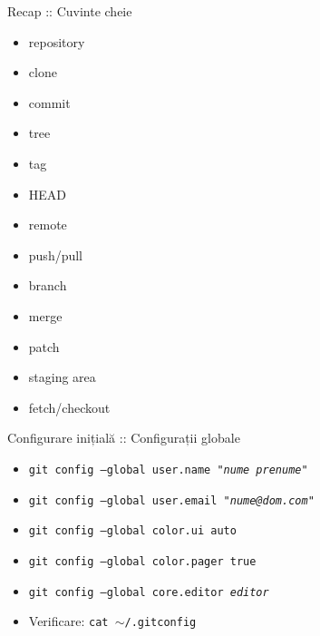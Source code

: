 \documentclass{beamer}
\begin{document}
\begin{frame}{Recap :: Cuvinte cheie}
  \begin{itemize}
    \item repository
    \item clone
    \item commit
    \item tree
    \item tag
    \item HEAD
    \item remote
    \item push/pull
    \item branch
    \item merge
    \item patch
    \item staging area
    \item fetch/checkout
  \end{itemize}
\end{frame}


\begin{frame}{Configurare inițială :: Configurații globale}
  \begin{itemize}
    \item \texttt{git config --global user.name "\textit{nume prenume}"}
    \item \texttt{git config --global user.email "\textit{nume@dom.com}"}
    \item \texttt{git config --global color.ui auto}
    \item \texttt{git config --global color.pager true}
    \item \texttt{git config --global core.editor \textit{editor}}
  \end{itemize}
  \begin{itemize}
    \item Verificare: \texttt{cat $\sim$/.gitconfig}
  \end{itemize}
\end{frame}
\end{document}
